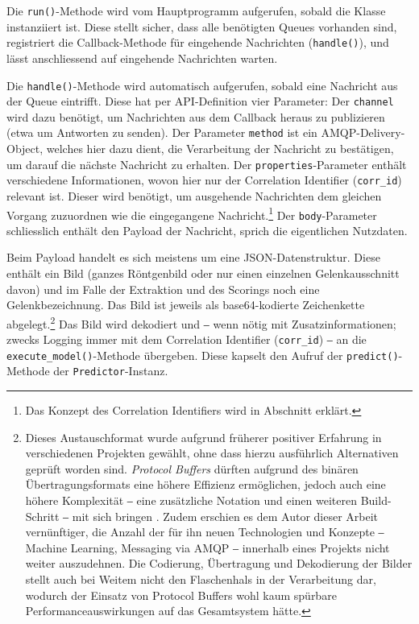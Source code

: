 Die \texttt{run()}-Methode wird vom Hauptprogramm aufgerufen, sobald die Klasse instanziiert ist. Diese stellt sicher, dass alle benötigten Queues vorhanden sind, registriert die Callback-Methode für eingehende Nachrichten (\texttt{handle()}), und lässt anschliessend auf eingehende Nachrichten warten.

Die \texttt{handle()}-Methode wird automatisch aufgerufen, sobald eine Nachricht aus der Queue eintrifft. Diese hat per API-Definition vier Parameter: Der \texttt{channel} wird dazu benötigt, um Nachrichten aus dem Callback heraus zu publizieren (etwa um Antworten zu senden). Der Parameter \texttt{method} ist ein AMQP-Delivery-Object, welches hier dazu dient, die Verarbeitung der Nachricht zu bestätigen, um darauf die nächste Nachricht zu erhalten. Der \texttt{properties}-Parameter enthält verschiedene Informationen, wovon hier nur der Correlation Identifier (\texttt{corr\_id}) relevant ist. Dieser wird benötigt, um ausgehende Nachrichten dem gleichen Vorgang zuzuordnen wie die eingegangene Nachricht.\footnote{Das Konzept des Correlation Identifiers wird in Abschnitt  erklärt.} Der \texttt{body}-Parameter schliesslich enthält den Payload der Nachricht, sprich die eigentlichen Nutzdaten.

Beim Payload handelt es sich meistens um eine JSON-Datenstruktur. Diese enthält ein Bild (ganzes Röntgenbild oder nur einen einzelnen Gelenkausschnitt davon) und im Falle der Extraktion und des Scorings noch eine Gelenkbezeichnung. Das Bild ist jeweils als base64-kodierte Zeichenkette abgelegt.\footnote{Dieses Austauschformat wurde aufgrund früherer positiver Erfahrung in verschiedenen Projekten gewählt, ohne dass hierzu ausführlich Alternativen geprüft worden sind. \textit{Protocol Buffers} dürften aufgrund des binären Übertragungsformats eine höhere Effizienz ermöglichen, jedoch auch eine höhere Komplexität ‒ eine zusätzliche Notation und einen weiteren Build-Schritt ‒ mit sich bringen \cite{protobuf}. Zudem erschien es dem Autor dieser Arbeit vernünftiger, die Anzahl der für ihn neuen Technologien und Konzepte ‒ Machine Learning, Messaging via AMQP ‒ innerhalb eines Projekts nicht weiter auszudehnen. Die Codierung, Übertragung und Dekodierung der Bilder stellt auch bei Weitem nicht den Flaschenhals in der Verarbeitung dar, wodurch der Einsatz von Protocol Buffers wohl kaum spürbare Performanceauswirkungen auf das Gesamtsystem hätte.} Das Bild wird dekodiert und ‒ wenn nötig mit Zusatzinformationen; zwecks Logging immer mit dem Correlation Identifier (\texttt{corr\_id})  ‒ an die \texttt{execute\_model()}-Methode übergeben. Diese kapselt den Aufruf der \texttt{predict()}-Methode der \texttt{Pre\-dictor}-Instanz.

